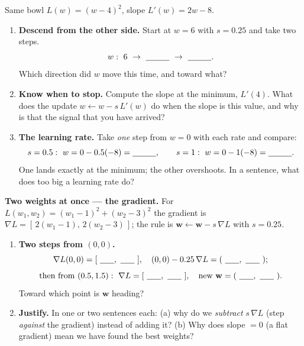 \documentclass[10pt]{article}
\newcommand{\ww}{\mathbf{w}}
\begin{document}
\begin{tcolorbox}[colback=white, colframe=black!40, title=\textbf{Tier A --- Approaching Proficiency},
    fonttitle=\bfseries, arc=1.5mm, left=3mm, right=3mm, top=2mm, bottom=2mm, breakable]
Same bowl $L(w)=(w-4)^2$, slope $L'(w)=2w-8$.
\begin{enumerate}[leftmargin=1.7em, itemsep=9pt]
  \item \textbf{Descend from the other side.} Start at $w=6$ with $s=0.25$ and take two steps.
        \[ w:\ 6\ \to\ \blank{1.0cm}\ \to\ \blank{1.0cm}. \]
        Which direction did $w$ move this time, and toward what? \writeline
  \item \textbf{Know when to stop.} Compute the slope at the minimum, $L'(4)$. What does the update
        $w\leftarrow w-s\,L'(w)$ do when the slope is this value, and why is that the signal that you have
        arrived? \writeline
  \item \textbf{The learning rate.} Take \emph{one} step from $w=0$ with each rate and compare:
        \[ s=0.5:\ w=0-0.5(-8)=\blank{1.0cm},\qquad s=1:\ w=0-1(-8)=\blank{1.0cm}. \]
        One lands exactly at the minimum; the other overshoots. In a sentence, what does too big a learning
        rate do? \writeline
\end{enumerate}
\end{tcolorbox}

\begin{tcolorbox}[colback=white, colframe=black!40, title=\textbf{Tier E --- Extension},
    fonttitle=\bfseries, arc=1.5mm, left=3mm, right=3mm, top=2mm, bottom=2mm, breakable]
\textbf{Two weights at once --- the gradient.} For $L(w_1,w_2)=(w_1-1)^2+(w_2-3)^2$ the gradient is
$\nabla L=[\,2(w_1-1),\,2(w_2-3)\,]$; the rule is $\ww\leftarrow\ww-s\,\nabla L$ with $s=0.25$.
\begin{enumerate}[leftmargin=1.7em, itemsep=9pt]
  \item \textbf{Two steps from $(0,0)$.}
        \[ \nabla L(0,0)=[\ \blank{0.6cm},\ \blank{0.6cm}\ ],\quad (0,0)-0.25\,\nabla L=(\ \blank{0.6cm},\ \blank{0.6cm}\ ); \]
        \[ \text{then from }(0.5,1.5):\ \nabla L=[\ \blank{0.6cm},\ \blank{0.6cm}\ ],\quad \text{new }\ww=(\ \blank{0.6cm},\ \blank{0.6cm}\ ). \]
        Toward which point is $\ww$ heading? \writeline
  \item \textbf{Justify.} In one or two sentences each: (a) why do we \emph{subtract} $s\,\nabla L$ (step
        \emph{against} the gradient) instead of adding it? (b) Why does slope $=0$ (a flat gradient) mean we
        have found the best weights? \writeline
\end{enumerate}
\end{tcolorbox}
\end{document}
